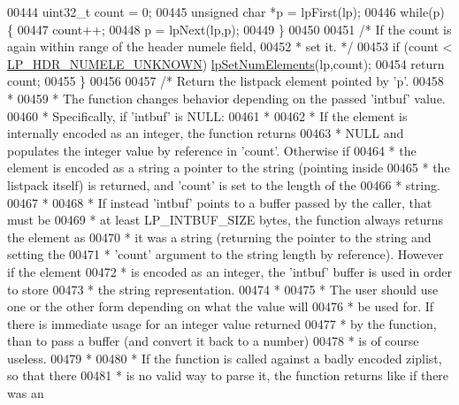 \begin{DoxyCode}
00444     uint32\_t count = 0;
00445     \textcolor{keywordtype}{unsigned} \textcolor{keywordtype}{char} *p = lpFirst(lp);
00446     \textcolor{keywordflow}{while}(p) \{
00447         count++;
00448         p = lpNext(lp,p);
00449     \}
00450 
00451     \textcolor{comment}{/* If the count is again within range of the header numele field,}
00452 \textcolor{comment}{     * set it. */}
00453     \textcolor{keywordflow}{if} (count < \hyperlink{listpack_8c_aabaec596aac6d7d8370b7d801638b022}{LP\_HDR\_NUMELE\_UNKNOWN}) 
      \hyperlink{listpack_8c_abd63c5b3f66f6d270759fa5e3c319ce8}{lpSetNumElements}(lp,count);
00454     \textcolor{keywordflow}{return} count;
00455 \}
00456 
00457 \textcolor{comment}{/* Return the listpack element pointed by 'p'.}
00458 \textcolor{comment}{ *}
00459 \textcolor{comment}{ * The function changes behavior depending on the passed 'intbuf' value.}
00460 \textcolor{comment}{ * Specifically, if 'intbuf' is NULL:}
00461 \textcolor{comment}{ *}
00462 \textcolor{comment}{ * If the element is internally encoded as an integer, the function returns}
00463 \textcolor{comment}{ * NULL and populates the integer value by reference in 'count'. Otherwise if}
00464 \textcolor{comment}{ * the element is encoded as a string a pointer to the string (pointing inside}
00465 \textcolor{comment}{ * the listpack itself) is returned, and 'count' is set to the length of the}
00466 \textcolor{comment}{ * string.}
00467 \textcolor{comment}{ *}
00468 \textcolor{comment}{ * If instead 'intbuf' points to a buffer passed by the caller, that must be}
00469 \textcolor{comment}{ * at least LP\_INTBUF\_SIZE bytes, the function always returns the element as}
00470 \textcolor{comment}{ * it was a string (returning the pointer to the string and setting the}
00471 \textcolor{comment}{ * 'count' argument to the string length by reference). However if the element}
00472 \textcolor{comment}{ * is encoded as an integer, the 'intbuf' buffer is used in order to store}
00473 \textcolor{comment}{ * the string representation.}
00474 \textcolor{comment}{ *}
00475 \textcolor{comment}{ * The user should use one or the other form depending on what the value will}
00476 \textcolor{comment}{ * be used for. If there is immediate usage for an integer value returned}
00477 \textcolor{comment}{ * by the function, than to pass a buffer (and convert it back to a number)}
00478 \textcolor{comment}{ * is of course useless.}
00479 \textcolor{comment}{ *}
00480 \textcolor{comment}{ * If the function is called against a badly encoded ziplist, so that there}
00481 \textcolor{comment}{ * is no valid way to parse it, the function returns like if there was an}

\end{DoxyCode}
